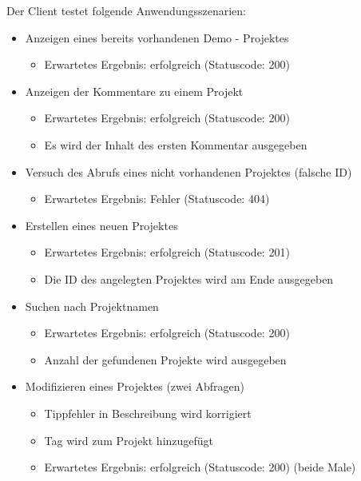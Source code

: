 \documentclass[12pt]{scrartcl}
\begin{document}
			Der Client testet folgende Anwendungsszenarien:
			\begin{itemize}
				\item Anzeigen eines bereits vorhandenen Demo - Projektes
				\begin{itemize}
					\item Erwartetes Ergebnis: erfolgreich (Statuscode: 200)
				\end{itemize}
				\item Anzeigen der Kommentare zu einem Projekt
				\begin{itemize}
					\item Erwartetes Ergebnis: erfolgreich (Statuscode: 200)
					\item Es wird der Inhalt des ersten Kommentar ausgegeben
				\end{itemize}
				\item Versuch des Abrufs eines nicht vorhandenen Projektes (falsche ID)
				\begin{itemize}
					\item Erwartetes Ergebnis: Fehler (Statuscode: 404)
				\end{itemize}
				\item Erstellen eines neuen Projektes
				\begin{itemize}
					\item Erwartetes Ergebnis: erfolgreich (Statuscode: 201)
					\item Die ID des angelegten Projektes wird am Ende ausgegeben
				\end{itemize}
				\item Suchen nach Projektnamen
				\begin{itemize}
					\item Erwartetes Ergebnis: erfolgreich (Statuscode: 200)
					\item Anzahl der gefundenen Projekte wird ausgegeben
				\end{itemize}
				\item Modifizieren eines Projektes (zwei Abfragen)
				\begin{itemize}
					\item Tippfehler in Beschreibung wird korrigiert
					\item Tag wird zum Projekt hinzugefügt
					\item Erwartetes Ergebnis: erfolgreich (Statuscode: 200) (beide Male)
				\end{itemize}
				

\end{itemize}
\end{document}
